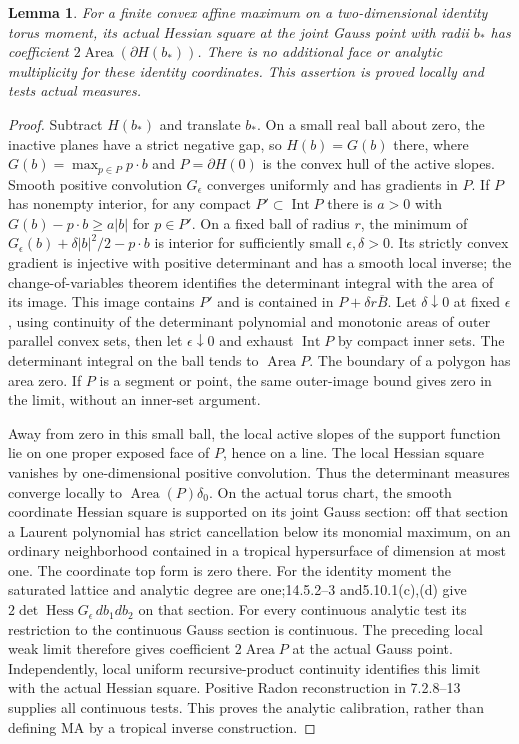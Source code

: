 \documentclass[11pt]{article}
\newtheorem{lemma}[theorem]{Lemma}
\begin{document}
\begin{lemma}\label{branch:area}
For a finite convex affine maximum on a two-dimensional identity torus
moment, its actual Hessian square at the joint Gauss point with radii
$b_*$ has coefficient $2\operatorname{Area}(\partial H(b_*))$.
There is no additional face or analytic multiplicity for these identity
coordinates. This assertion is proved locally and tests actual measures.
\end{lemma}
\begin{proof}
Subtract $H(b_*)$ and translate $b_*$. On a small real ball about zero,
the inactive planes have a strict negative gap, so $H(b)=G(b)$ there,
where $G(b)=\max_{p\in P}p\cdot b$ and $P=\partial H(0)$ is the convex
hull of the active slopes. Smooth positive convolution $G_\epsilon$
converges uniformly and has gradients in $P$. If $P$ has nonempty interior,
for any compact $P'\subset\operatorname{Int}P$ there is $a>0$ with
$G(b)-p\cdot b\ge a|b|$ for $p\in P'$. On a fixed ball of radius $r$,
the minimum of $G_\epsilon(b)+\delta|b|^2/2-p\cdot b$ is interior for
sufficiently small $\epsilon,\delta>0$. Its strictly convex gradient is
injective with positive determinant and has a smooth local inverse;
the change-of-variables theorem identifies the determinant integral with
the area of its image. This image contains $P'$ and is contained in
$P+\delta r\overline B$. Let $\delta\downarrow0$ at fixed $\epsilon$,
using continuity of the determinant polynomial and monotonic areas of
outer parallel convex sets, then let $\epsilon\downarrow0$ and exhaust
$\operatorname{Int}P$ by compact inner sets. The determinant integral on
the ball tends to $\operatorname{Area}P$. The boundary of a polygon has
area zero. If $P$ is a segment or point, the same outer-image bound gives
zero in the limit, without an inner-set argument.

Away from zero in this small ball, the local active slopes of the support
function lie on one proper exposed face of $P$, hence on a line. The
local Hessian square vanishes by one-dimensional positive convolution.
Thus the determinant measures converge locally to
$\operatorname{Area}(P)\delta_0$.
On the actual torus chart, the smooth coordinate Hessian square is
supported on its joint Gauss section: off that section a Laurent polynomial
has strict cancellation below its monomial maximum, on an ordinary
neighborhood contained in a tropical hypersurface of dimension at most
one. The coordinate top form is zero there. For the identity moment the
saturated lattice and analytic degree are one;14.5.2--3 and5.10.1(c),(d)
give $2\det\operatorname{Hess}G_\epsilon\,db_1db_2$ on that section.
For every continuous analytic test its restriction to the continuous
Gauss section is continuous. The preceding local weak limit therefore
gives coefficient $2\operatorname{Area}P$ at the actual Gauss point.
Independently, local uniform recursive-product continuity identifies this
limit with the actual Hessian square. Positive Radon reconstruction in
7.2.8--13 supplies all continuous tests. This proves the analytic
calibration, rather than defining MA by a tropical inverse construction.
\end{proof}
\end{document}

